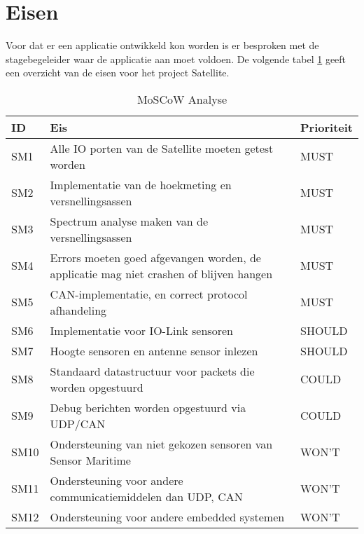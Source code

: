 \section{Eisen}
Voor dat er een applicatie ontwikkeld kon worden is er besproken met de stagebegeleider waar de applicatie aan moet voldoen. De volgende tabel \ref{tab:eisen} geeft een overzicht van de eisen voor het project Satellite.
\begin{table}[h!]
	\centering
	\caption{MoSCoW Analyse}
	\label{tab:eisen}
	\begin{tabular}{lp{13cm}l}
	\toprule
	\textbf{ID} & \textbf{Eis} & \textbf{Prioriteit} \\ \midrule
	SM1			& Alle IO porten van de Satellite moeten getest worden 										& MUST	 \\
	SM2			& Implementatie van de hoekmeting en versnellingsassen 										& MUST	 \\ 
	SM3			& Spectrum analyse maken van de versnellingsassen 											& MUST	 \\ 
	SM4			& Errors moeten goed afgevangen worden, de applicatie mag niet crashen of blijven hangen 	& MUST	 \\ 
	SM5			& CAN-implementatie, en correct protocol afhandeling										& MUST	 \\ \midrule
	SM6			& Implementatie voor IO-Link sensoren 														& SHOULD \\
	SM7			& Hoogte sensoren en antenne sensor inlezen 												& SHOULD \\  \midrule
	SM8			& Standaard datastructuur voor packets die worden opgestuurd								& COULD	 \\
	SM9			& Debug berichten worden opgestuurd via UDP/CAN 											& COULD	 \\  \midrule
	SM10		& Ondersteuning van niet gekozen sensoren van Sensor Maritime 								& WON'T	 \\
	SM11		& Ondersteuning voor andere communicatiemiddelen dan UDP, CAN 								& WON'T	 \\
	SM12		& Ondersteuning voor andere embedded systemen  												& WON'T	 \\\bottomrule
	\end{tabular}
\end{table}
